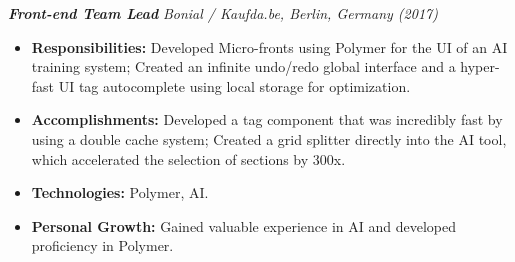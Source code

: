 \documentclass[a4paper,10pt]{article}
\begin{document}
\begin{minipage}[t]{0.65\textwidth}
\begin{minipage}[t]{\dimexpr\linewidth-25px}
    \textbf{\textit{Front-end Team Lead}}
    \textit{\small Bonial / Kaufda.be, Berlin, Germany (2017)}
    \vspace{0.3cm}
    \begin{itemize}[leftmargin=*]
        \item \textbf{Responsibilities:} Developed Micro-fronts using Polymer for the UI of an AI training system; Created
    an infinite undo/redo global interface and a hyper-fast UI tag autocomplete using local storage for
    optimization.
        \item \textbf{Accomplishments:} Developed a tag component that was incredibly fast by using a double cache
    system; Created a grid splitter directly into the AI tool, which accelerated the selection of sections by
    300x.
        \item \textbf{Technologies:} Polymer, AI.
        \item \textbf{Personal Growth:} Gained valuable experience in AI and developed proficiency in Polymer.
    \end{itemize}
\end{minipage}\hspace{5px}
\end{minipage}%
\end{document}
